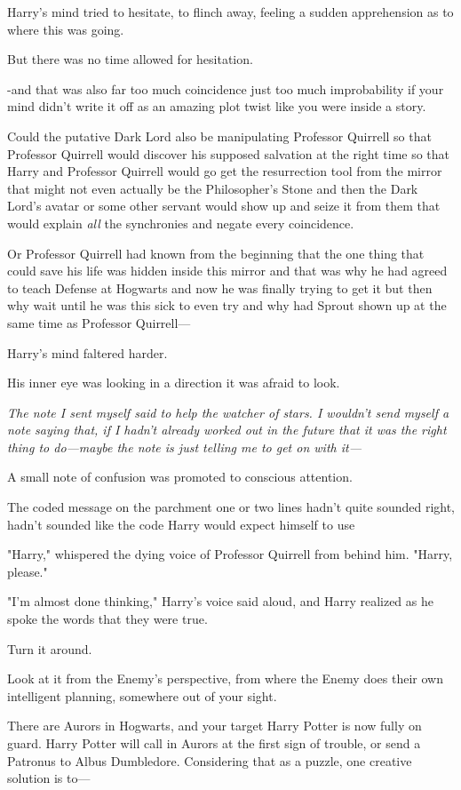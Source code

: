 Harry's mind tried to hesitate, to flinch away, feeling a sudden apprehension
as to where this was going.

But there was no time allowed for hesitation.

-and that was also far too much coincidence just too much improbability if your
mind didn't write it off as an amazing plot twist like you were inside a story.

Could the putative Dark Lord also be manipulating Professor Quirrell so that
Professor Quirrell would discover his supposed salvation at the right time so
that Harry and Professor Quirrell would go get the resurrection tool from the
mirror that might not even actually be the Philosopher's Stone and then the
Dark Lord's avatar or some other servant would show up and seize it from them
that would explain \emph{all} the synchronies and negate every coincidence.

Or Professor Quirrell had known from the beginning that the one thing that
could save his life was hidden inside this mirror and that was why he had
agreed to teach Defense at Hogwarts and now he was finally trying to get it but
then why wait until he was this sick to even try and why had Sprout shown up at
the same time as Professor Quirrell—

Harry's mind faltered harder.

His inner eye was looking in a direction it was afraid to look.

\emph{The note I sent myself said to help the watcher of stars. I wouldn't send
myself a note saying that, if I hadn't already worked out in the future that it
was the right thing to do—maybe the note is just telling me to get on with
it—}

A small note of confusion was promoted to conscious attention.

The coded message on the parchment{\el} one or two lines hadn't quite
sounded right, hadn't sounded like the code Harry would expect himself to
use{\el}

"Harry," whispered the dying voice of Professor Quirrell from behind him.
"Harry, please."

"I'm almost done thinking," Harry's voice said aloud, and Harry realized as he
spoke the words that they were true.

Turn it around.

Look at it from the Enemy's perspective, from where the Enemy does their own
intelligent planning, somewhere out of your sight.

There are Aurors in Hogwarts, and your target Harry Potter is now fully on
guard. Harry Potter will call in Aurors at the first sign of trouble, or send a
Patronus to Albus Dumbledore. Considering that as a puzzle, one creative
solution is to—

